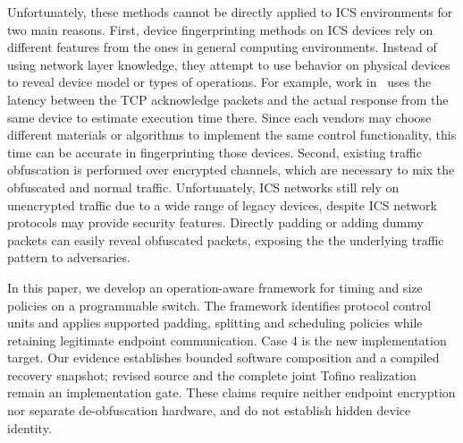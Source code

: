 Unfortunately, these methods cannot be directly applied to ICS environments for two main
reasons. First, device fingerprinting methods on ICS devices rely on different features from the
ones in general computing environments. Instead of using network layer knowledge, they attempt
to use behavior on physical devices to reveal device model or types of operations. For example,
work in~\cite{formby2016, shen2018, ahmed2021, pospisil2023} uses the latency between the
TCP acknowledge packets and the actual response from the same device to estimate execution time
there. Since each
vendors may choose different materials or algorithms to implement the same control
functionality, this time can be accurate in fingerprinting those devices. Second, existing
traffic obfuscation is performed over encrypted channels, which are necessary to mix the
obfuscated and normal traffic. Unfortunately, ICS networks still rely on unencrypted traffic due
to a wide range of legacy devices, despite ICS network protocols may provide security features.
Directly padding or adding dummy packets can easily reveal obfuscated packets, exposing the the
underlying traffic pattern to adversaries.

In this paper, we develop an operation-aware framework for timing and size
policies on a programmable switch. The framework identifies protocol control
units and applies supported padding, splitting and scheduling policies while
retaining legitimate endpoint communication. Case 4 is the new implementation
target. Our evidence establishes bounded software composition and a compiled
recovery snapshot; revised source and the complete joint Tofino realization remain an
implementation gate. These claims require neither endpoint encryption nor
separate de-obfuscation hardware, and do not establish hidden device identity.
